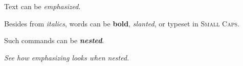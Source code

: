 \documentclass{article}
\begin{document}
Text can be \emph{emphasized}. %

Besides from \textit{italics}, words can be \textbf{bold}, \textsl{slanted}, or typeset in \textsc{Small Caps}.

Such commands can be \textit{\textbf{nested}}.

\emph{See how \emph{emphasizing} looks when nested.}
\end{document}
